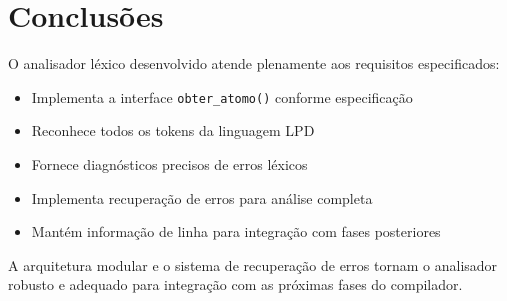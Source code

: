 \documentclass[12pt]{article}
\begin{document}
\section{Conclusões}

O analisador léxico desenvolvido atende plenamente aos requisitos especificados:

\begin{itemize}[noitemsep]
    \item Implementa a interface \texttt{obter\_atomo()} conforme especificação
    \item Reconhece todos os tokens da linguagem LPD
    \item Fornece diagnósticos precisos de erros léxicos
    \item Implementa recuperação de erros para análise completa
    \item Mantém informação de linha para integração com fases posteriores
\end{itemize}

A arquitetura modular e o sistema de recuperação de erros tornam o analisador robusto e adequado para integração com as próximas fases do compilador.
\end{document}
